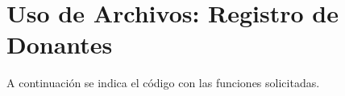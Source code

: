 \section*{Uso de Archivos: Registro de Donantes}
 
  A continuación se indica el código con las funciones
  solicitadas.
  
    
